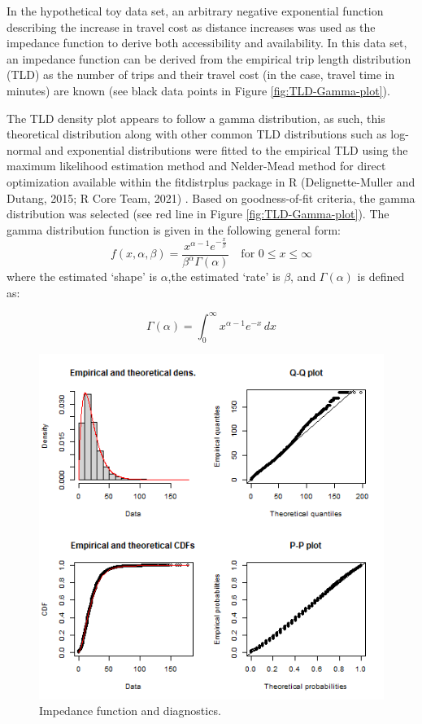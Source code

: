 \documentclass[]{elsarticle} %
\begin{document}
In the hypothetical toy data set, an arbitrary negative exponential
function describing the increase in travel cost as distance increases
was used as the impedance function to derive both accessibility and
availability. In this data set, an impedance function can be derived
from the empirical trip length distribution (TLD) as the number of trips
and their travel cost (in the case, travel time in minutes) are known
(see black data points in Figure \ref{fig:TLD-Gamma-plot}).

The TLD density plot appears to follow a gamma distribution, as such,
this theoretical distribution along with other common TLD distributions
such as log-normal and exponential distributions were fitted to the
empirical TLD using the maximum likelihood estimation method and
Nelder-Mead method for direct optimization available within the
fitdistrplus package in R (Delignette-Muller and Dutang, 2015; R Core
Team, 2021) . Based on goodness-of-fit criteria, the gamma distribution
was selected (see red line in Figure \ref{fig:TLD-Gamma-plot}). The
gamma distribution function is given in the following general form: \[ 
f(x, \alpha, \beta) = \frac {x^{\alpha-1}e^{-\frac{x}{\beta}}}{ \beta^{\alpha}\Gamma(\alpha)} \quad \text{for } 0 \leq x \leq \infty
\] \noindent where the estimated `shape' is \(\alpha\),the estimated
`rate' is \(\beta\), and \(\Gamma(\alpha)\) is defined as:

\[
\Gamma(\alpha) =  \int_{0}^{\infty} x^{\alpha-1}e^{-x} \,dx
\]

\begin{figure}
\includegraphics[width=1\linewidth]{images/impedance_function} \caption{\label{fig:impedance-function-plot}Impedance function and diagnostics.}\label{fig:plot-impedance-function}
\end{figure}
\end{document}

